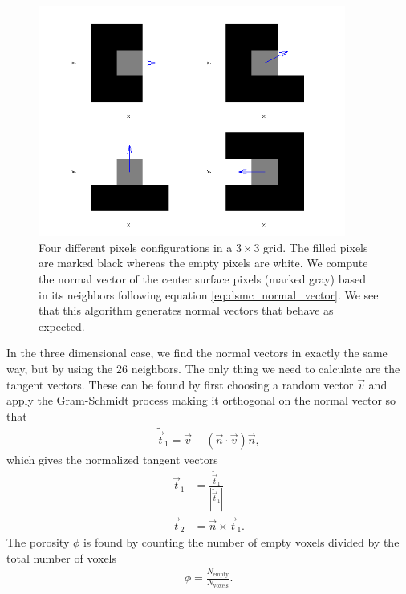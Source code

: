 \begin{figure}[ht]
\begin{center}
\includegraphics[width=0.9\textwidth, trim=0cm 0cm 0cm 0cm, clip]{DSMC/figures/normal_vectors.png}
\end{center}
\caption{Four different pixels configurations in a $3\times 3$ grid. The filled pixels are marked black whereas the empty pixels are white. We compute the normal vector of the center surface pixels (marked gray) based in its neighbors following equation \eqref{eq:dsmc_normal_vector}. We see that this algorithm generates normal vectors that behave as expected.}
\label{fig:dsmc_normal_vectors}
\end{figure}
In the three dimensional case, we find the normal vectors in exactly the same way, but by using the 26 neighbors. The only thing we need to calculate are the tangent vectors. These can be found by first choosing a random vector $\vec v$ and apply the Gram-Schmidt process making it orthogonal on the normal vector so that
\begin{align}
	\tilde{\vec t}_1 = \vec v - (\vec n\cdot \vec v)\vec n,
\end{align}
which gives the normalized tangent vectors
\begin{align}
	\vec t_1 &= \frac{ \tilde{\vec t}_1}{|\tilde{\vec t}_1|}\\
	\vec t_2 &= \vec n\times \vec t_1.
\end{align}
The porosity $\phi$ is found by counting the number of empty voxels divided by the total number of voxels
\begin{align}
	\label{eq:dsmc_geometry_porosity}
	\phi = \frac{N_\text{empty}}{N_\text{voxels}}.
\end{align}